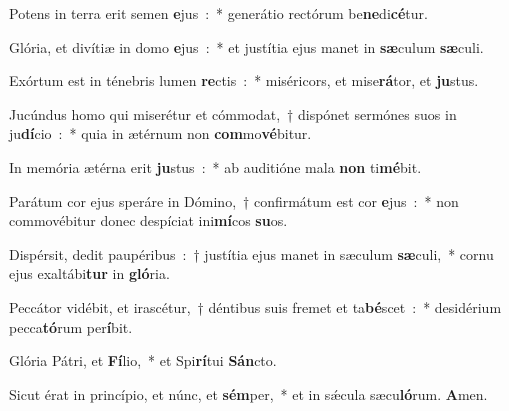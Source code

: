 ﻿\item Potens in terra erit semen \textbf{e}jus~:~* generátio rectórum be\textbf{ne}di\textbf{cé}tur.
\item Glória, et divítiæ in domo \textbf{e}jus~:~* et justítia ejus manet in \textbf{sæ}\-culum \textbf{sæ}culi.
\item Exórtum est in ténebris lumen \textbf{re}\-ctis~:~* miséricors, et mise\textbf{rá}\-tor, et \textbf{ju}stus.
\item Jucúndus homo qui miserétur et cómmodat,~† dispónet sermónes suos in ju\textbf{dí}\-cio~:~* quia in ætérnum non \textbf{com}mo\textbf{vé}bitur.
\item In memória ætérna erit \textbf{ju}\-stus~:~* ab auditióne mala \textbf{non} ti\textbf{mé}bit.
\item Parátum cor ejus speráre in Dómino,~† confirmátum est cor \textbf{e}jus~:~* non commovébitur donec despíciat ini\textbf{mí}\-cos \textbf{su}os.
\item Dispérsit, dedit paupéribus~:~† justítia ejus manet in sæculum \textbf{sæ}\-culi,~* cornu ejus exaltábi\textbf{tur} in \textbf{gló}ria.
\item Peccátor vidébit, et irascétur,~† déntibus suis fremet et ta\textbf{bé}\-scet~:~* desidérium pecca\textbf{tó}\-rum per\textbf{í}bit.
\item Glória Pátri, et \textbf{Fí}\-lio,~* et Spi\textbf{rí}\-tui \textbf{Sán}cto.
\item Sicut érat in princípio, et núnc, et \textbf{sém}\-per,~* et in sǽcula sæcu\textbf{ló}\-rum. \textbf{A}men.
